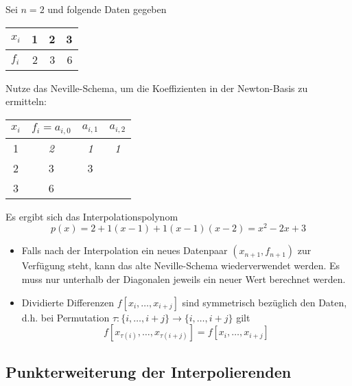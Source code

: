 \documentclass[11pt]{scrbook}
\begin{document}
\begin{ex*}
	Sei $n=2$ und folgende Daten gegeben
	\begin{table}[H]
		\centering
		\begin{tabular}{l|rrr}
			$x_i$ & 1 & 2 & 3  \\ \hline
			$f_i$ & 2 & 3 & 6 
		\end{tabular}
	\end{table}
	Nutze das Neville-Schema, um die Koeffizienten in der Newton-Basis zu ermitteln:
	\begin{table}[H]
		\centering
		\begin{tabular}{c|ccc}
			$x_i$ & $f_i=a_{i,0}$ & $a_{i,1}$ & $a_{i,2}$ \\ \hline
			1 & \emph{2} & \emph{1} & \emph{1} \\
			2 & 3 & 3 & \\
			3 & 6 & &
		\end{tabular}
	\end{table}
	Es ergibt sich das Interpolationspolynom
	\[
		p(x) = 2+ 1(x-1) + 1(x-1)(x-2) = x^2 -2x+3
	\]
\end{ex*}

\begin{note}
	\begin{itemize}
		\item Falls nach der Interpolation ein neues Datenpaar $(x_{n+1},f_{n+1})$ zur Verfügung steht, kann das alte Neville-Schema wiederverwendet werden.
			Es muss nur unterhalb der Diagonalen jeweils ein neuer Wert berechnet werden.
		\item
			Dividierte Differenzen $f[x_i,\dotsc,x_{i+j}]$ sind symmetrisch bezüglich den Daten, d.h. bei Permutation $\tau: \{i,\dotsc,i+j\} \to \{i,\dotsc,i+j\}$ gilt
			\[
				f[x_{\tau(i)},\dotsc,x_{\tau(i+j)}] = f[x_i,\dotsc,x_{i+j}]
			\]
	\end{itemize}
\end{note}

\subsection{Punkterweiterung der Interpolierenden}
\end{document}
